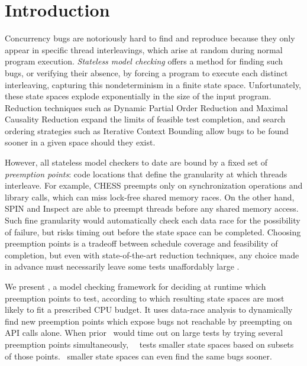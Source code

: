 \section{Introduction}

Concurrency bugs are notoriously hard to find and reproduce because they only appear in specific thread interleavings, which arise at random during normal program execution.
{\em Stateless model checking} \cite{verisoft} offers a method for finding such bugs,
or verifying their absence,
by forcing a program to execute each distinct interleaving,
capturing
this nondeterminism in a finite state space.
Unfortunately, these state spaces explode exponentially in the size of the input program.
Reduction techniques such as Dynamic Partial Order Reduction \cite{dpor} and Maximal Causality Reduction \cite{mcr} expand the limits of feasible test completion,
and search ordering strategies such as Iterative Context Bounding \cite{chess-icb} allow bugs to be found sooner in a given space should they exist.

However, all stateless model checkers to date are bound by a fixed set of {\em preemption points}: code locations that define the granularity at which threads interleave.
For example, \textsc{CHESS} \cite{chess} preempts only on synchronization operations and library calls, which can miss lock-free shared memory races.
%
On the other hand, SPIN \cite{spin} and Inspect \cite{inspect}
are able to preempt threads before any shared memory access.
Such fine granularity would automatically check each data race for the possibility of failure, but risks timing out before the state space can be completed. %
Choosing preemption points is a tradeoff between schedule coverage and feasibility of completion,
but even with state-of-the-art reduction techniques,
any choice made in advance must necessarily leave some tests unaffordably large \cite{parrot,mcr}.

We present \quicksand,
a model checking framework for deciding at runtime which preemption points to test,
according to which resulting state spaces are most likely to fit a prescribed CPU budget.
It uses data-race analysis \cite{eraser} to dynamically find new preemption points which expose bugs not reachable by preempting on API calls alone.
When prior ~would time out on large tests by trying several preemption points simultaneously,
\quicksand~~tests smaller state spaces based on subsets of those points.
~smaller state spaces can even find the same bugs sooner.

